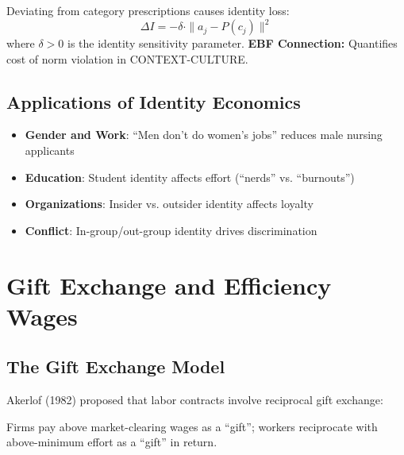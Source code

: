 \begin{axiom}
\label{ax:ga3}
Deviating from category prescriptions causes identity loss:
\begin{equation}
\Delta I = -\delta \cdot \|a_j - P(c_j)\|^2
\end{equation}
where $\delta > 0$ is the identity sensitivity parameter.
\textbf{EBF Connection:} Quantifies cost of norm violation in CONTEXT-CULTURE.
\end{axiom}

\subsection{Applications of Identity Economics}

\begin{tcolorbox}[colback=blue!5!white, colframe=blue!75!black, title=Identity Economics Applications]
\begin{itemize}
    \item \textbf{Gender and Work}: ``Men don't do women's jobs'' reduces male nursing applicants
    \item \textbf{Education}: Student identity affects effort (``nerds'' vs. ``burnouts'')
    \item \textbf{Organizations}: Insider vs. outsider identity affects loyalty
    \item \textbf{Conflict}: In-group/out-group identity drives discrimination
\end{itemize}
\end{tcolorbox}

\section{Gift Exchange and Efficiency Wages}

\subsection{The Gift Exchange Model}

Akerlof (1982) proposed that labor contracts involve reciprocal gift exchange:

\begin{definition}
Firms pay above market-clearing wages as a ``gift''; workers reciprocate with above-minimum effort as a ``gift'' in return.
\end{definition}

